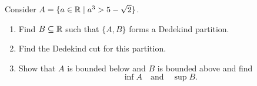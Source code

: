 \begingroup
\renewcommand{\labelenumi}{(\alph{enumi})}
\begin{exercise}
  \label{ex:hw03:cubic-dedekind-cut}
  Consider $A=\{a\in\mathbb{R}\mid a^3>5-\sqrt{2}\}$.
  \begin{enumerate}
    \item Find $B\subseteq\mathbb{R}$ such that $\{A,B\}$ forms a Dedekind partition.
    \item Find the Dedekind cut for this partition.
    \item Show that $A$ is bounded below and $B$ is bounded above and find
      \[
        \inf A\quad\text{and}\quad\sup B.
      \]
  \end{enumerate}
\end{exercise}
\endgroup
